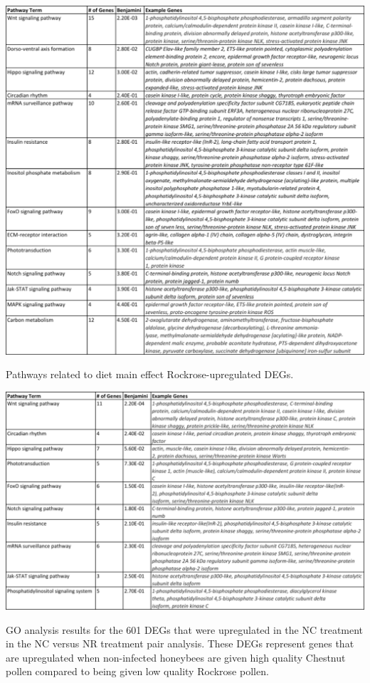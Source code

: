 \documentclass[11pt,a4paper,oldfontcommands,openany]{memoir}
\numberwithin{equation}{section} %
\begin{document}
\begin{table}[H]
  \includegraphics[width=\textwidth]{Images/ChestnutPathways}
  \caption{Pathways related to diet main effect Rockrose-upregulated DEGs.}
  \label{tbl:RockrosePathways}
\end{table}

\begin{table}[H]
  \includegraphics[width=\textwidth]{Images/NCNRNCPathways}
  \caption{GO analysis results for the 601 DEGs that were upregulated in the NC treatment in the NC versus NR treatment pair analysis. These DEGs represent genes that are upregulated when non-infected honeybees are given high quality Chestnut pollen compared to being given low quality Rockrose pollen.}
  \label{tbl:NCNRNCPathways}
\end{table}
\end{document}
